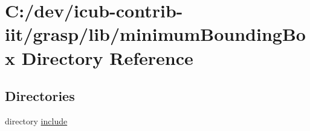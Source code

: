 \section{C\+:/dev/icub-\/contrib-\/iit/grasp/lib/minimum\+Bounding\+Box Directory Reference}
\label{dir_357637a3c8939ffefc469ddfa5ac3486}
\subsection*{Directories}
\begin{DoxyCompactItemize}
\item 
directory \hyperlink{dir_5e9667666f48d5f70c57743a51d0c483}{include}
\end{DoxyCompactItemize}
